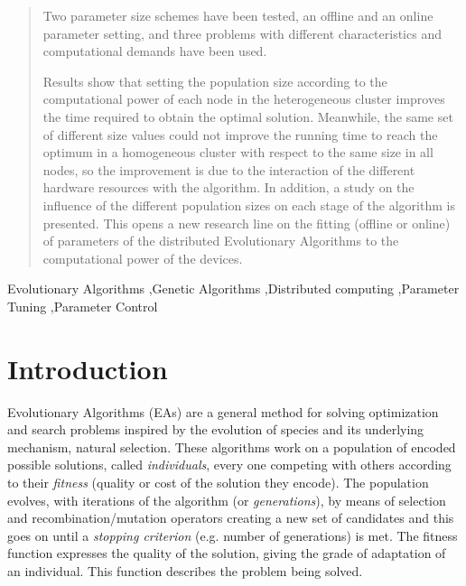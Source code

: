 \documentclass[final,1p,times]{elsarticle}
\begin{document}
\begin{frontmatter}
\begin{abstract}
Two  parameter size schemes have been tested, an offline and an online parameter setting, and three 
problems with different characteristics and computational demands have
been used. 

Results show
that setting the population size according to the computational power
of each node in the heterogeneous cluster improves the time required
to obtain the optimal solution. 
Meanwhile, the same set of
different size values could not improve the running time  to reach the optimum 
 in a homogeneous
cluster with respect to the same size in all nodes, so the improvement is due to the interaction of the different hardware
resources with the algorithm. In addition, a study on the influence of
the different population sizes on each stage of the algorithm is
presented. This opens a new research line on the fitting (offline
or online) of parameters of the distributed Evolutionary Algorithms to the computational power of the devices.





 
\end{abstract}

\begin{keyword}

Evolutionary Algorithms \sep Genetic Algorithms \sep Distributed computing \sep Parameter Tuning \sep Parameter Control

\end{keyword}

\end{frontmatter}

\section{Introduction}
\label{sec:intro}



Evolutionary Algorithms (EAs) are a general method for solving
optimization and search problems inspired by the evolution of species
and its underlying mechanism, natural selection. These algorithms work
on a population of encoded
possible solutions, called {\em individuals}, every one competing with others according to their
{\em fitness} (quality or cost of the solution they encode). The population evolves, with iterations of the algorithm (or {\em generations}), 
by means of selection and recombination/mutation operators 
creating a new set of candidates and this goes on until a {\em stopping criterion}
(e.g. number of generations) is met. The fitness function expresses
the quality of the solution, giving the grade of adaptation of an
individual. This function describes the problem being
solved. 
\end{document}
